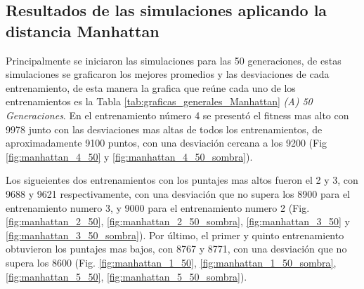 \documentclass[conference]{IEEEtran}
\begin{document}
\subsection{Resultados de las simulaciones aplicando la distancia Manhattan}
Principalmente se iniciaron las simulaciones para las 50 generaciones, de estas simulaciones se graficaron los mejores promedios y las desviaciones de cada entrenamiento, de esta manera la grafica que reúne cada uno de los entrenamientos es la Tabla \ref{tab:graficas_generales_Manhattan} \textit{(A) 50 Generaciones}.
En el entrenamiento número 4 se presentó el fitness mas alto con 9978 junto con las desviaciones mas altas de todos los entrenamientos, de aproximadamente 9100 puntos, con una desviación cercana a los 9200 (Fig \ref{fig:manhattan_4_50} y \ref{fig:manhattan_4_50_sombra}).

Los sigueientes dos entrenamientos con los puntajes mas altos fueron el 2 y 3, con 9688 y 9621 respectivamente, con una desviación que no supera los 8900 para el entrenamiento numero 3, y 9000 para el entrenamiento numero 2 (Fig. \ref{fig:manhattan_2_50}, \ref{fig:manhattan_2_50_sombra}, \ref{fig:manhattan_3_50} y \ref{fig:manhattan_3_50_sombra}). Por último, el primer y quinto entrenamiento obtuvieron los puntajes mas bajos, con 8767 y 8771, con una desviación que no supera los 8600 (Fig. \ref{fig:manhattan_1_50}, \ref{fig:manhattan_1_50_sombra}, \ref{fig:manhattan_5_50}, \ref{fig:manhattan_5_50_sombra}).
\end{document}
